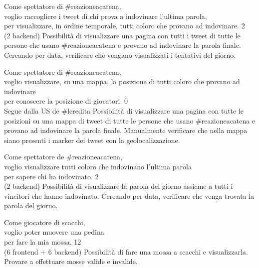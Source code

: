 \userstory%
{Come spettatore di \#reazioneacatena,\\voglio raccogliere i tweet di chi prova a indovinare l'ultima parola,\\per visualizzare, in ordine temporale, tutti coloro che provano ad indovinare.}%
{2\\(2 backend)}%
{Possibilità di visualizzare una pagina con tutti i tweet di tutte le persone che usano \#reazioneacatena e provano ad indovinare la parola finale.}%
{Cercando per data, verificare che vengano visualizzati i tentativi del giorno.}

\userstory%
{Come spettatore di \#reazioneacatena,\\voglio visualizzare, su una mappa, la posizione di tutti coloro che provano ad indovinare\\per conoscere la posizione di giocatori.}%
{0\\Segue dalla US de \#leredita}%
{Possibilità di visualizzare una pagina con tutte le posizioni su una mappa di tweet di tutte le persone che usano \#reazioneacatena e provano ad indovinare la parola finale.}%
{Manualmente verificare che nella mappa siano presenti i marker dei tweet con la geolocalizzazione.}

\userstory%
{Come spettatore de \#reazioneacatena,\\voglio visualizzare tutti coloro che indovinano l'ultima parola\\per sapere chi ha indovinato.}%
{2\\(2 backend)}%
{Possibilità di visualizzare la parola del giorno assieme a tutti i vincitori che hanno indovinato.}%
{Cercando per data, verificare che venga trovata la parola del giorno.}

\userstory%
{Come giocatore di scacchi,\\voglio poter muovere una pedina\\per fare la mia mossa.}%
{12\\(6 frontend + 6 backend)}%
{Possibilità di fare una mossa a scacchi e visualizzarla.}%
{Provare a effettuare mosse valide e invalide.}


\newpage
